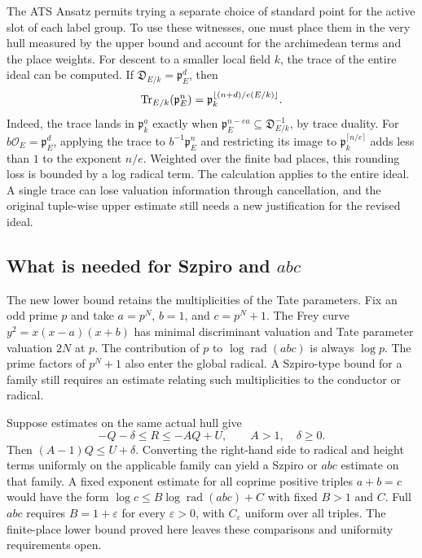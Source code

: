 \documentclass[UTF8,fontset=none,zihao=-4,a4paper]{ctexart}
\newcommand{\OO}{\mathcal O}
\newcommand{\rad}{\operatorname{rad}}
\begin{document}
The ATS Ansatz permits trying a separate choice of standard point for the active slot of each label group. To use these witnesses, one must place them in the very hull measured by the upper bound and account for the archimedean terms and the place weights. For descent to a smaller local field \(k\), the trace of the entire ideal can be computed. If \(\mathfrak D_{E/k}=\mathfrak p_E^d\), then
\[
 {\rm Tr}_{E/k}(\mathfrak p_E^n)
 =\mathfrak p_k^{\lfloor(n+d)/e(E/k)\rfloor}.
\]
Indeed, the trace lands in \(\mathfrak p_k^a\) exactly when \(\mathfrak p_E^{n-ea}\subseteq\mathfrak D_{E/k}^{-1}\), by trace duality. For \(b\OO_E=\mathfrak p_E^d\), applying the trace to \(b^{-1}\mathfrak p_E^n\) and restricting its image to \(\mathfrak p_k^{\lceil n/e\rceil}\) adds less than \(1\) to the exponent \(n/e\). Weighted over the finite bad places, this rounding loss is bounded by a log radical term. The calculation applies to the entire ideal. A single trace can lose valuation information through cancellation, and the original tuple-wise upper estimate still needs a new justification for the revised ideal.\cite{riemcode,adapt}

\subsection{What is needed for Szpiro and \texorpdfstring{\(abc\)}{abc}}
The new lower bound retains the multiplicities of the Tate parameters. Fix an odd prime \(p\) and take \(a=p^N\), \(b=1\), and \(c=p^N+1\). The Frey curve \(y^2=x(x-a)(x+b)\) has minimal discriminant valuation and Tate parameter valuation \(2N\) at \(p\). The contribution of \(p\) to \(\log\rad(abc)\) is always \(\log p\). The prime factors of \(p^N+1\) also enter the global radical. A Szpiro-type bound for a family still requires an estimate relating such multiplicities to the conductor or radical.

Suppose estimates on the same actual hull give
\[
 -Q-\delta\le R\le-AQ+U,\qquad A>1,\quad\delta\ge0.
\]
Then \((A-1)Q\le U+\delta\). Converting the right-hand side to radical and height terms uniformly on the applicable family can yield a Szpiro or \(abc\) estimate on that family. A fixed exponent estimate for all coprime positive triples \(a+b=c\) would have the form \(\log c\le B\log\rad(abc)+C\) with fixed \(B>1\) and \(C\). Full \(abc\) requires \(B=1+\varepsilon\) for every \(\varepsilon>0\), with \(C_\varepsilon\) uniform over all triples. The finite-place lower bound proved here leaves these comparisons and uniformity requirements open.
\end{document}
